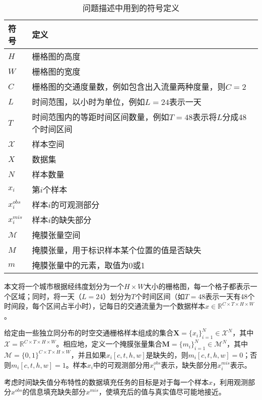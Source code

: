 \vspace{1em}
\begin{table}[htbp]
\caption{问题描述中用到的符号定义} \label{tb1}
\vspace{0.5em}\centering\wuhao
\begin{tabular}{ll}
\toprule[1.5pt]
\textbf{符号} & \textbf{定义} \\
\midrule[1pt]
$H$ & 栅格图的高度 \\
$W$ & 栅格图的宽度 \\
$C$ & 栅格图的交通度量数，例如包含出入流量两种度量，则$C=2$ \\
$L$ & 时间范围，以小时为单位，例如$L=24$表示一天 \\
$T$ & 时间范围内的等距时间区间数量，例如$T=48$表示将$L$分成48个时间区间 \\
$\mathcal{X}$ & 样本空间 \\
$X$ & 数据集 \\
$N$ & 样本数量 \\
$x_i$ & 第$i$个样本 \\
$x_i^{obs}$ & 样本$i$的可观测部分 \\
$x_i^{mis}$ & 样本$i$的缺失部分 \\
$\mathcal{M}$ & 掩膜张量空间 \\
$M$ & 掩膜张量，用于标识样本某个位置的值是否缺失 \\
$m$ & 掩膜张量中的元素，取值为0或1 \\
\bottomrule[1.5pt]
\end{tabular}
\end{table}

本文将一个城市根据经纬度划分为一个$H \times W$大小的栅格图，每一个格子都表示一个区域；同时，将一天（$L=24$）划分为$T$个时间区间（如$T=48$表示一天有48个时间段，每个区间占半小时），记每日的交通流量为一个数据样本$x \in \mathbb{R}^{C\times T \times H \times W}$。

给定由一些独立同分布的时空交通栅格样本组成的集合$\mathbf{X}=\{x_{i}\}_{i=1}^{N}\in \mathcal{X}^{N}$，其中$\mathcal{X}=\mathbb{R}^{C\times T \times H \times W}$。相应地，定义一个掩膜张量集合$\mathbf{M}=\{m_{i}\}_{i=1}^{N}\in \mathcal{M}^{N}$，其中$\mathcal{M}=\{0,1\}^{C\times T \times H \times W}$，并且如果$x_i[c, t, h, w]$是缺失的，则$m_i[c, t, h, w]=0$；否则$m_i[c, t, h, w]=1$。样本$x_i$中的可观测部分用$x_i^{obs}$表示，缺失部分用$x_i^{mis}$表示。

考虑时间缺失值分布特性的数据填充任务的目标是对于每一个样本$x$，利用观测部分$x^{obs}$的信息填充缺失部分$x^{mis}$，使填充后的值与真实值尽可能地接近。

